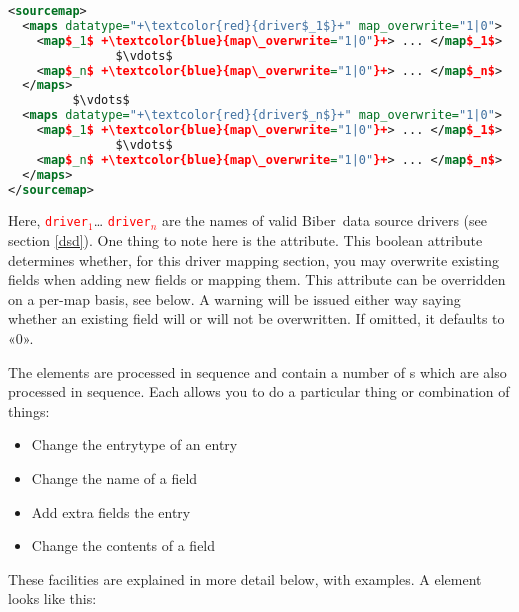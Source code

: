 \documentclass{ltxdockit}
\newcommand*{\biber}{Biber\xspace}
\begin{document}
\lstset{showspaces=false}
\lstset{showstringspaces=false}
\begin{lstlisting}[language=xml,escapechar=+,mathescape=true]
<sourcemap>
  <maps datatype="+\textcolor{red}{driver$_1$}+" map_overwrite="1|0">
    <map$_1$ +\textcolor{blue}{map\_overwrite="1|0"}+> ... </map$_1$>
               $\vdots$
    <map$_n$ +\textcolor{blue}{map\_overwrite="1|0"}+> ... </map$_n$>
  </maps>
         $\vdots$
  <maps datatype="+\textcolor{red}{driver$_n$}+" map_overwrite="1|0">
    <map$_1$ +\textcolor{blue}{map\_overwrite="1|0"}+> ... </map$_1$>
               $\vdots$
    <map$_n$ +\textcolor{blue}{map\_overwrite="1|0"}+> ... </map$_n$>
  </maps>
</sourcemap>
\end{lstlisting}

\noindent Here, \textcolor{red}{\texttt{driver$_1$}}\ldots
\textcolor{red}{\texttt{driver$_n$}} are the names of valid \biber\ data
source drivers (see section \ref{dsd}). One thing to note here is the
 attribute. This boolean attribute determines whether,
for this driver mapping section, you may overwrite existing fields when
adding new fields or mapping them. This attribute can be overridden on a
per-map basis, see below. A warning will be issued either way saying
whether an existing field will or will not be overwritten. If omitted, it
defaults to «0».

The  elements are processed in sequence and contain a number of
s which are also processed in sequence. Each 
allows you to do a particular thing or combination of things:

\begin{itemize}
\item Change the entrytype of an entry
\item Change the name of a field
\item Add extra fields the entry
\item Change the contents of a field
\end{itemize}

\noindent These facilities are explained in more detail below, with
examples. A  element looks like this:
\end{document}
